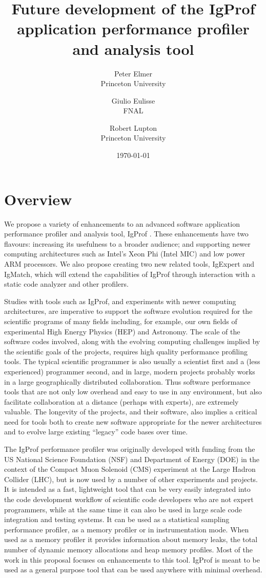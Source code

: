 \documentclass[notitlepage,letter,12pt]{article}
\title{Future development of the IgProf application performance profiler and analysis tool}
\author{Peter Elmer\\
Princeton University\\
\email{Peter.Elmer@cern.ch} \and
Giulio Eulisse\\
FNAL\\
\email{Giulio.Eulisse@cern.ch} \and
Robert Lupton\\
Princeton University\\
\email{rhl@astro.princeton.edu}}
\date{\today}
\begin{document}
\maketitle

\section{Overview}

We propose a variety of enhancements to an advanced software
application performance profiler and analysis tool, IgProf \cite{IGPROF}.
These enhancements have two flavours: increasing its usefulness to
a broader audience; and supporting newer computing architectures
such as Intel's Xeon Phi (Intel MIC) and low power ARM processors.
We also propose creating two new related tools, IgExpert and IgMatch,
which will extend the capabilities of IgProf through interaction
with a static code analyzer and other profilers.

Studies with tools such as IgProf, and experiments with newer computing 
architectures,
are imperative to support the software evolution required for the
scientific programs of many fields including, for example, our own
fields of experimental
High Energy Physics (HEP) and Astronomy.  The scale of the software codes involved,
along with the evolving computing challenges implied by the scientific goals 
of the projects, requires high quality performance profiling tools.
The typical scientific programmer is also usually a scientist 
first and a (less experienced) programmer second, and in large, modern
projects probably works in a large geographically distributed collaboration. 
Thus software performance tools that are not only low overhead and easy
to use in any environment, but also facilitate collaboration at a distance
(perhaps with experts), are extremely valuable. The longevity of the
projects, and their software, also implies a critical need for tools both
to create new software appropriate for the newer architectures and to
evolve large existing ``legacy'' code bases over time. 

The IgProf performance profiler was originally developed 
with funding from the US National Science Foundation (NSF) and Department 
of Energy (DOE) in the context of the Compact Muon Solenoid (CMS) \cite{CMSDET} 
experiment at the Large Hadron Collider (LHC), but is now used by a number of other experiments and 
projects. It is intended as a fast, 
lightweight tool that can be very easily integrated into the code
development workflow of scientific code developers who are not expert 
programmers, while at the same time it can also be used in large scale 
code integration and testing systems. It can be used as a statistical 
sampling performance profiler, as a memory profiler or in instrumentation 
mode.  When used as a memory profiler it provides information about 
memory leaks, the total number of dynamic memory allocations and heap memory
profiles. Most of the work in this proposal focuses on enhancements
to this tool. IgProf is meant to be used as a general purpose tool
that can be used anywhere with minimal overhead.
\end{document}
